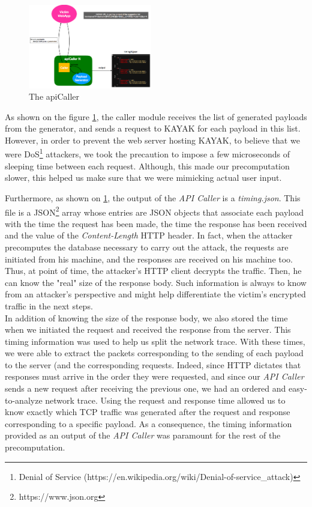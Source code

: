 \documentclass[journal]{IEEEtran}
\begin{document}
\begin{figure}[h]
\centering
\includegraphics[width=0.48\textwidth]{images/apiCaller.png}
\caption{The apiCaller}
\label{fig:apiCaller}
\end{figure}

As shown on the figure \ref{fig:apiCaller}, the caller module receives the list of generated payloads from the generator, and sends a request to KAYAK for each payload in this list. However, in order to prevent the web server hosting KAYAK, to believe that we were DoS\footnote{Denial of Service (https://en.wikipedia.org/wiki/Denial-of-service\_attack)} attackers, we took the precaution to impose a few microseconds of sleeping time between each request. Although, this made our precomputation slower, this helped us make sure that we were mimicking actual user input.

\medskip

Furthermore, as shown on \ref{fig:apiCaller}, the output of the \emph{API Caller} is a \emph{timing.json}. This file is a JSON\footnote{https://www.json.org} array whose entries are JSON objects that associate each payload with the time the request has been made, the time the response has been received and the value of the \emph{Content-Length} HTTP header. In fact, when the attacker precomputes the database necessary to carry out the attack, the requests are initiated from his machine, and the responses are received on his machine too. Thus, at point of time, the attacker's HTTP client decrypts the traffic. Then, he can know the "real" size of the response body. Such information is always to know from an attacker's perspective and might help differentiate the victim's encrypted traffic in the next steps. \\
In addition of knowing the size of the response body, we also stored the time when we initiated the request and received the response from the server. This timing information was used to help us split the network trace. With these times, we were able to extract the packets corresponding to the sending of each payload to the server (and the corresponding requests. Indeed, since HTTP dictates that responses must arrive in the order they were requested, and since our \emph{API Caller} sends a new request after receiving the previous one, we had an ordered and easy-to-analyze network trace. Using the request and response time allowed us to know exactly which TCP traffic was generated after the request and response corresponding to a specific payload. As a consequence, the timing information provided as an output of the \emph{API Caller} was paramount for the rest of the precomputation.
\end{document}

